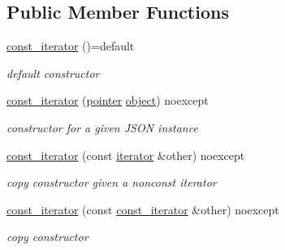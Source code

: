\subsection*{Public Member Functions}
\begin{DoxyCompactItemize}
\item 
\hyperlink{classnlohmann_1_1basic__json_1_1const__iterator_ac6fdaff67857f82a623e5cc253917639}{const\-\_\-iterator} ()=default
\begin{DoxyCompactList}\small\item\em default constructor \end{DoxyCompactList}\item 
\hyperlink{classnlohmann_1_1basic__json_1_1const__iterator_a23de834b11bd895209aa65c100ab9ceb}{const\-\_\-iterator} (\hyperlink{classnlohmann_1_1basic__json_1_1const__iterator_a1da96fc3054d547e7706d3a2f073f389}{pointer} \hyperlink{classnlohmann_1_1basic__json_ad25b2f8c21e241e2d63455537a9294ff}{object}) noexcept
\begin{DoxyCompactList}\small\item\em constructor for a given J\-S\-O\-N instance \end{DoxyCompactList}\item 
\hyperlink{classnlohmann_1_1basic__json_1_1const__iterator_a6b950c6bc081ac1ec1540ec05ceb2603}{const\-\_\-iterator} (const \hyperlink{classnlohmann_1_1basic__json_1_1iterator}{iterator} \&other) noexcept
\begin{DoxyCompactList}\small\item\em copy constructor given a nonconst iterator \end{DoxyCompactList}\item 
\hyperlink{classnlohmann_1_1basic__json_1_1const__iterator_a18c35a6735d3da96b4fc026421c05dd8}{const\-\_\-iterator} (const \hyperlink{classnlohmann_1_1basic__json_1_1const__iterator}{const\-\_\-iterator} \&other) noexcept
\begin{DoxyCompactList}\small\item\em copy constructor \end{DoxyCompactList}\item 

\end{DoxyCompactItemize}
